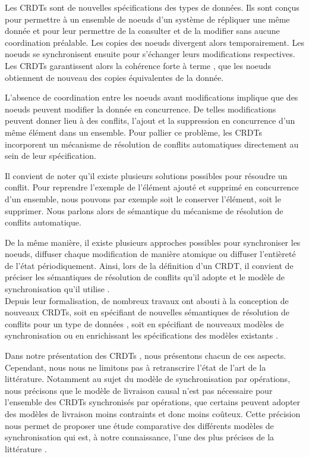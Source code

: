 Les \acfp{CRDT} \cite{shapiro_2011_crdt} sont de nouvelles spécifications des types de données.
Ils sont conçus pour permettre à un ensemble de noeuds d'un système de répliquer une même donnée et pour leur permettre de la consulter et de la modifier sans aucune coordination préalable.
Les copies des noeuds divergent alors temporairement.
Les noeuds se synchronisent ensuite pour s'échanger leurs modifications respectives.
Les \acp{CRDT} garantissent alors la cohérence forte à terme \cite{shapiro_2011_crdt}, \ie que les noeuds obtiennent de nouveau des copies équivalentes de la donnée.

L'absence de coordination entre les noeuds avant modifications implique que des noeuds peuvent modifier la donnée en concurrence.
De telles modifications peuvent donner lieu à des conflits, \eg l'ajout et la suppression en concurrence d'un même élément dans un ensemble.
Pour pallier ce problème, les \acp{CRDT} incorporent un mécanisme de résolution de conflits automatiques directement au sein de leur spécification.

Il convient de noter qu'il existe plusieurs solutions possibles pour résoudre un conflit.
Pour reprendre l'exemple de l'élément ajouté et supprimé en concurrence d'un ensemble, nous pouvons par exemple soit le conserver l'élément, soit le supprimer.
Nous parlons alors de sémantique du mécanisme de résolution de conflits automatique.

De la même manière, il existe plusieurs approches possibles pour synchroniser les noeuds, \eg diffuser chaque modification de manière atomique ou diffuser l'entièreté de l'état périodiquement.
Ainsi, lors de la définition d'un \ac{CRDT}, il convient de préciser les sémantiques de résolution de conflits qu'il adopte et le modèle de synchronisation qu'il utilise \cite{2018-crdts-overview-preguica}.\\

Depuis leur formalisation, de nombreux travaux ont abouti à la conception de nouveaux \acp{CRDT}, soit en spécifiant de nouvelles sémantiques de résolution de conflits pour un type de données \cite{2020-cl-set-weihai}, soit en spécifiant de nouveaux modèles de synchronisation \cite{Almeida_2018} ou en enrichissant les spécifications des modèles existants \cite{baquero2017pure,enes2019}.

Dans notre présentation des \acp{CRDT} , nous présentons chacun de ces aspects.
Cependant, nous nous ne limitons pas à retranscrire l'état de l'art de la littérature.
Notamment au sujet du modèle de synchronisation par opérations, nous précisons que le modèle de livraison causal n'est pas nécessaire pour l'ensemble des \acp{CRDT} synchronisés par opérations, \ie que certains peuvent adopter des modèles de livraison moins contraints et donc moins coûteux.
Cette précision nous permet de proposer une étude comparative des différents modèles de synchronisation qui est, à notre connaissance, l'une des plus précises de la littérature .\\

